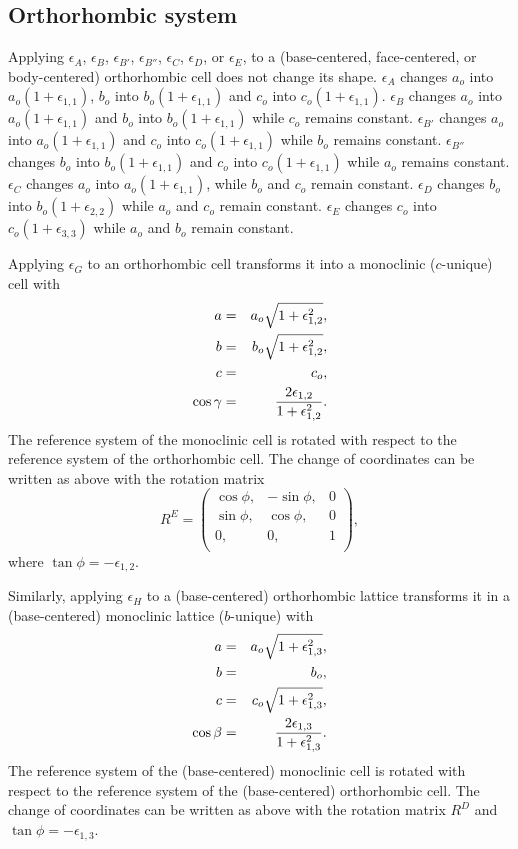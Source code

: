 \documentclass[12pt,a4paper]{article}
\begin{document}
\subsection{\color{web-blue}Orthorhombic system}
Applying $\epsilon_A$, $\epsilon_B$, $\epsilon_{B'}$, $\epsilon_{B''}$, 
$\epsilon_C$, $\epsilon_D$, or $\epsilon_E$, to a (base-centered, 
face-centered, or body-centered) orthorhombic cell does not change its shape. 
$\epsilon_A$ changes $a_o$ into $a_o(1+\epsilon_{1,1})$, $b_o$ into
$b_o(1+\epsilon_{1,1})$ and $c_o$ into $c_o(1+\epsilon_{1,1})$.
$\epsilon_B$ changes $a_o$ into $a_o(1+\epsilon_{1,1})$ and $b_o$ into
$b_o(1+\epsilon_{1,1})$ while $c_o$ remains constant.
$\epsilon_{B'}$ changes $a_o$ into $a_o(1+\epsilon_{1,1})$ and $c_o$ into
$c_o(1+\epsilon_{1,1})$ while $b_o$ remains constant.
$\epsilon_{B''}$ changes $b_o$ into $b_o(1+\epsilon_{1,1})$ and $c_o$ into
$c_o(1+\epsilon_{1,1})$ while $a_o$ remains constant.
$\epsilon_C$ changes $a_o$ into 
$a_o(1+\epsilon_{1,1})$, while $b_o$ and $c_o$ remain constant.
$\epsilon_D$ changes $b_o$ into $b_o(1+\epsilon_{2,2})$ while
$a_o$ and $c_o$ remain constant.
$\epsilon_E$ changes $c_o$ into $c_o(1+\epsilon_{3,3})$ while $a_o$ and
$b_o$ remain constant.

Applying $\epsilon_G$ to an orthorhombic cell transforms it into a 
monoclinic ($c$-unique) cell with
\begin{eqnarray}
a&=&a_o \sqrt{1+\epsilon_{1,2}^2}, \\
b&=&b_o \sqrt{1+\epsilon_{1,2}^2}, \\
c&=&c_o, \\
\cos\gamma &=& {2 \epsilon_{1,2} \over 1 + \epsilon_{1,2}^2}.
\end{eqnarray}
The reference system of the monoclinic cell is rotated with respect to
the reference system of the orthorhombic cell. 
The change of coordinates can be written as above with the rotation matrix 
\begin{equation}
R^E=\left( \begin{array}{ccc}
\cos\phi, & -\sin\phi, & 0 \\
\sin\phi, &  \cos\phi, & 0 \\
0, & 0, & 1 \\
\end{array}
\right),
\end{equation}
where $\tan \phi=-\epsilon_{1,2}$.

Similarly, applying $\epsilon_H$ to a (base-centered) 
orthorhombic lattice transforms
it in a (base-centered) monoclinic lattice ($b$-unique) with 
\begin{eqnarray}
a&=&a_o \sqrt{1+\epsilon_{1,3}^2}, \\
b&=&b_o, \\
c&=&c_o \sqrt{1+\epsilon_{1,3}^2}, \\
\cos\beta &=& {2 \epsilon_{1,3} \over 1 + \epsilon_{1,3}^2}. 
\end{eqnarray}
The reference system of the (base-centered) monoclinic cell is 
rotated with respect to the reference system of the (base-centered) 
orthorhombic cell. 
The change of coordinates can be written as above with the rotation matrix 
$R^D$ and $\tan \phi=-\epsilon_{1,3}$.
\end{document}
